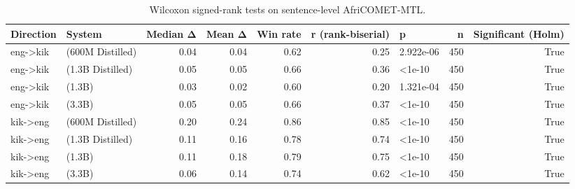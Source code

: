 \begin{table}
\caption{Wilcoxon signed-rank tests on sentence-level AfriCOMET-MTL.}
\label{tab:wilcoxon}
\begin{tabular}{llrrrrlrr}
\toprule
Direction & System & Median Δ & Mean Δ & Win rate & r (rank-biserial) & p & n & Significant (Holm) \\
\midrule
eng->kik & (600M Distilled) & 0.04 & 0.04 & 0.62 & 0.25 & 2.922e-06 & 450 & True \\
eng->kik & (1.3B Distilled) & 0.05 & 0.05 & 0.66 & 0.36 & <1e-10 & 450 & True \\
eng->kik & (1.3B) & 0.03 & 0.02 & 0.60 & 0.20 & 1.321e-04 & 450 & True \\
eng->kik & (3.3B) & 0.05 & 0.05 & 0.66 & 0.37 & <1e-10 & 450 & True \\
kik->eng & (600M Distilled) & 0.20 & 0.24 & 0.86 & 0.85 & <1e-10 & 450 & True \\
kik->eng & (1.3B Distilled) & 0.11 & 0.16 & 0.78 & 0.74 & <1e-10 & 450 & True \\
kik->eng & (1.3B) & 0.11 & 0.18 & 0.79 & 0.75 & <1e-10 & 450 & True \\
kik->eng & (3.3B) & 0.06 & 0.14 & 0.74 & 0.62 & <1e-10 & 450 & True \\
\bottomrule
\end{tabular}
\end{table}
